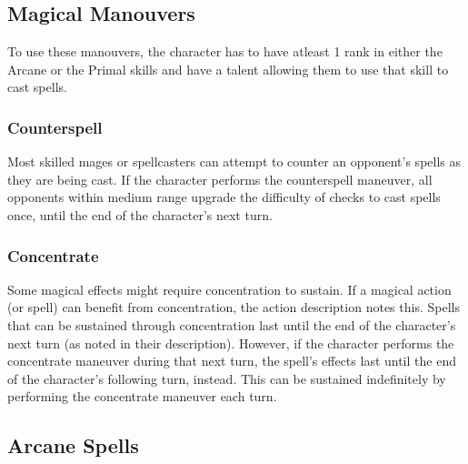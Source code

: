 \begin{multicols}{2}
\subsection{Magical Manouvers}
To use these manouvers, the character has to have atleast 1 rank in either
the Arcane or the Primal skills and have a talent allowing them to use that
skill to cast spells.

\subsubsection{Counterspell}
Most skilled mages or spellcasters can attempt to counter an opponent’s spells
as they are being cast. If the character performs the counterspell maneuver,
all opponents within medium range upgrade the difficulty of checks to cast
spells once, until the end of the character's next turn.
\subsubsection{Concentrate}
Some magical effects might require concentration to sustain. If a magical action
(or spell) can benefit from concentration, the action description notes this.
Spells that can be sustained through concentration last until the end of the
character's next turn (as noted in their description). However, if the character
performs the concentrate maneuver during that next turn, the spell’s effects last
until the end of the character’s following turn, instead. This can be sustained
indefinitely by performing the concentrate maneuver each turn.

\end{multicols}
\begin{multicols}{2}
\subsection{Arcane Spells}





%
\end{multicols}
